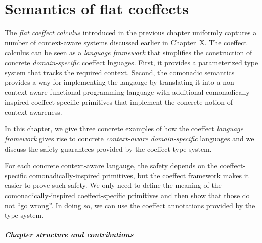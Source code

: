 
\chapter{Semantics of flat coeffects}
\label{ch:transl}

The \emph{flat coeffect calculus} introduced in the previous chapter uniformly captures a number
of context-aware systems discussed earlier in Chapter~X. The coeffect calculus can be seen
as a \emph{language framework} that simplifies the construction of concrete \emph{domain-specific}
coeffect lnguages. First, it provides a parameterized type system that tracks the required context.
Second, the comonadic semantics provides a way for implementing the langauge by translating
it into a non-context-aware functional programming language with additional comonadically-inspired
coeffect-specific primitives that implement the concrete notion of context-awareness.

In this chapter, we give three concrete examples of how the coeffect \emph{language framework}
gives rise to concrete \emph{context-aware domain-specific} languages and we discuss the safety
guarantees provided by the coeffect type system.

For each concrete context-aware langauge, the safety depends on the coeffect-specific 
comonadically-inspired primitives, but the coeffect framework makes it easier to prove such safety.
We only need to define the meaning of the comonadically-inspired coeffect-specific primitives
and then show that those do not ``go wrong''. In doing so, we can use the coeffect annotations
provided by the type system. 

\paragraph{Chapter structure and contributions}

